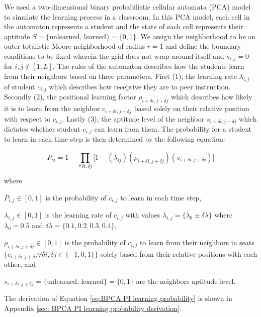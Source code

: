 We used a two-dimensional binary probabilistic cellular automata (PCA) model to simulate the learning process in a classroom. In this PCA model, each cell in the automaton represents a student and the state of each cell represents their aptitude $S=\lbrace\text{unlearned, learned}\rbrace=\lbrace 0,1 \rbrace$. We assign the neighborhood to be an outer-totalistic Moore neighborhood of radius $r=1$ and define the boundary conditions to be fixed wherein the grid does not wrap around itself and $s_{i,j} = 0$ for ${i,j \notin [1,L]}$. The rules of the automaton describes how the students learn from their neighbors based on three parameters. First (1), the learning rate $\lambda_{i,j}$ of student $c_{i,j}$ which describes how receptive they are to peer instruction. Secondly (2), the positional learning factor $\rho_{i+\delta i, j+\delta j}$ which describes how likely it is to learn from the neighbor $c_{i+\delta i, j+\delta j}$ based solely on their relative position with respect to $c_{i,j}$. Lastly (3), the aptitude level of the neighbor $s_{i+\delta i, j+\delta j}$ which dictates whether student $c_{i,j}$ can learn from them. The probability for a student to learn in each time step is then determined by the following equation:

\begin{equation}
    \label{eq:BPCA PI learning probability}
        P_{ij} = 1 - \prod_{\forall \delta i, \delta j}{\lbrack1-(\lambda_{ij})(\rho_{i+\delta i, j+\delta j})(s_{i+\delta i, j+\delta j})}\rbrack
\end{equation}

where

$P_{i,j} \in [0,1]$ is the probability of $c_{i,j}$ to learn in each time step, 

$\lambda_{i,j} \in [0,1]$ is the learning rate of $c_{i,j}$ with values $\lambda_{i,j} = \lbrace \lambda_0 \pm \delta \lambda \rbrace$ where $\lambda_0 = 0.5$ and $\delta \lambda = \lbrace 0.1, 0.2, 0.3, 0.4 \rbrace$, 

$\rho_{i+\delta i, j+\delta j} \in [0,1]$ is the probability of $c_{i,j}$ to learn from their neighbors in seats $\lbrace c_{i+\delta i, j+\delta j} \forall \delta i, \delta j \in \lbrace -1,0,1 \rbrace \rbrace$ solely based from their relative positions with each other, and

$s_{i+\delta i, j+\delta j} = \lbrace\text{unlearned, learned}\rbrace=\lbrace 0,1 \rbrace$ are the neighbors aptitude level.

The derivation of Equation \ref{eq:BPCA PI learning probability} is shown in Appendix \ref{sec: BPCA PI learning probability derivation}.

